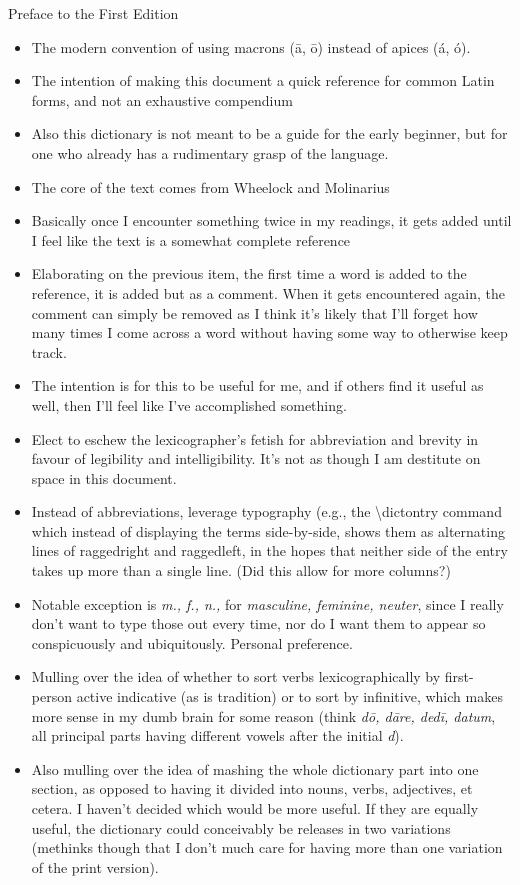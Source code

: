 Preface to the First Edition

\begin{itemize}
  \item The modern convention of using macrons (\=a, \=o)
    instead of apices (\'a, \'o).
  \item The intention of making this document a quick reference
    for common Latin forms, and not an exhaustive compendium
  \item Also this dictionary is not meant to be a guide for the
    early beginner, but for one who already has a rudimentary
    grasp of the language.
  \item The core of the text comes from Wheelock and Molinarius
  \item Basically once I encounter something twice in my readings,
    it gets added until I feel like the text is a somewhat
    complete reference
  \item Elaborating on the previous item, the first time a word
    is added to the reference, it is added but as a comment.  When
    it gets encountered again, the comment can simply be removed
    as I think it's likely that I'll forget how many times I come
    across a word without having some way to otherwise keep track.
  \item The intention is for this to be useful for me, and if others
    find it useful as well, then I'll feel like I've accomplished
    something.
  \item Elect to eschew the lexicographer's fetish for abbreviation
    and brevity in favour of legibility and intelligibility.  It's
    not as though I am destitute on space in this document.
  \item Instead of abbreviations, leverage typography (e.g., the
    \textbackslash dictontry command which instead of displaying the terms
    side-by-side, shows them as alternating lines of raggedright
    and raggedleft, in the hopes that neither side of the entry
    takes up more than a single line.  (Did this allow for more
    columns?)
  \item Notable exception is \textit{m., f., n.,} for \textit{%
    masculine, feminine, neuter}, since I really don't want to
    type those out every time, nor do I want them to appear so
    conspicuously and ubiquitously.  Personal preference.
  \item Mulling over the idea of whether to sort verbs
    lexicographically by first-person active indicative (as
    is tradition) or to sort by infinitive, which makes
    more sense in my dumb brain for some reason (think
    \textit{d\=o, d\=are, ded\=i, datum}, all principal parts
    having different vowels after the initial \textit{d}).
  \item Also mulling over the idea of mashing the whole
    dictionary part into one section, as opposed to having
    it divided into nouns, verbs, adjectives, et cetera.
    I haven't decided which would be more useful.  If they
    are equally useful, the dictionary could conceivably
    be releases in two variations (methinks though that I
    don't much care for having more than one variation of
    the print version).
\end{itemize}
